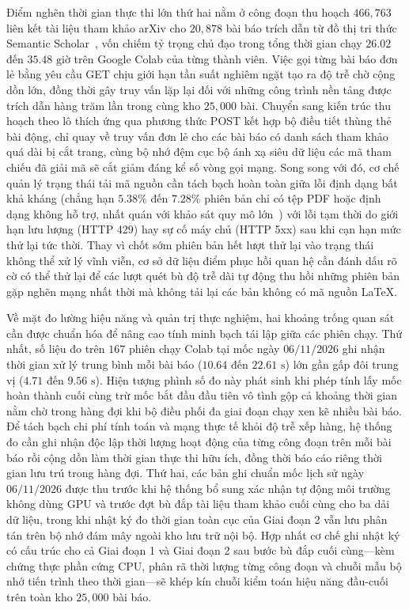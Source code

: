 Điểm nghẽn thời gian thực thi lớn thứ hai nằm ở công đoạn thu hoạch $466{,}763$ liên kết tài liệu tham khảo arXiv cho $20{,}878$ bài báo trích dẫn từ đồ thị tri thức Semantic Scholar~\cite{kinney2023,ammar2018}, vốn chiếm tỷ trọng chủ đạo trong tổng thời gian chạy $26.02$ đến $35.48\text{ giờ}$ trên Google Colab của từng thành viên. Việc gọi từng bài báo đơn lẻ bằng yêu cầu GET chịu giới hạn tần suất nghiêm ngặt tạo ra độ trễ chờ cộng dồn lớn, đồng thời gây truy vấn lặp lại đối với những công trình nền tảng được trích dẫn hàng trăm lần trong cùng kho $25{,}000$ bài. Chuyển sang kiến trúc thu hoạch theo lô thích ứng qua phương thức POST kết hợp bộ điều tiết thùng thẻ bài động, chỉ quay về truy vấn đơn lẻ cho các bài báo có danh sách tham khảo quá dài bị cắt trang, cùng bộ nhớ đệm cục bộ ánh xạ siêu dữ liệu các mã tham chiếu đã giải mã sẽ cắt giảm đáng kể số vòng gọi mạng. Song song với đó, cơ chế quản lý trạng thái tải mã nguồn cần tách bạch hoàn toàn giữa lỗi định dạng bất khả kháng (chẳng hạn $5.38\%$ đến $7.28\%$ phiên bản chỉ có tệp PDF hoặc định dạng không hỗ trợ, nhất quán với khảo sát quy mô lớn~\cite{ginev2024}) với lỗi tạm thời do giới hạn lưu lượng (HTTP 429) hay sự cố máy chủ (HTTP 5xx) sau khi cạn hạn mức thử lại tức thời. Thay vì chốt sớm phiên bản hết lượt thử lại vào trạng thái không thể xử lý vĩnh viễn, cơ sở dữ liệu điểm phục hồi quan hệ cần đánh dấu rõ cờ có thể thử lại để các lượt quét bù độ trễ dài tự động thu hồi những phiên bản gặp nghẽn mạng nhất thời mà không tải lại các bản không có mã nguồn LaTeX.

Về mặt đo lường hiệu năng và quản trị thực nghiệm, hai khoảng trống quan sát cần được chuẩn hóa để nâng cao tính minh bạch tái lập giữa các phiên chạy. Thứ nhất, số liệu đo trên $167$ phiên chạy Colab tại mốc ngày $06/11/2026$ ghi nhận thời gian xử lý trung bình mỗi bài báo ($10.64$ đến $22.61\text{ s}$) lớn gần gấp đôi trung vị ($4.71$ đến $9.56\text{ s}$). Hiện tượng phình số đo này phát sinh khi phép tính lấy mốc hoàn thành cuối cùng trừ mốc bắt đầu đầu tiên vô tình gộp cả khoảng thời gian nằm chờ trong hàng đợi khi bộ điều phối đa giai đoạn chạy xen kẽ nhiều bài báo. Để tách bạch chi phí tính toán và mạng thực tế khỏi độ trễ xếp hàng, hệ thống đo cần ghi nhận độc lập thời lượng hoạt động của từng công đoạn trên mỗi bài báo rồi cộng dồn làm thời gian thực thi hữu ích, đồng thời báo cáo riêng thời gian lưu trú trong hàng đợi. Thứ hai, các bản ghi chuẩn mốc lịch sử ngày $06/11/2026$ được thu trước khi hệ thống bổ sung xác nhận tự động môi trường không dùng GPU và trước đợt bù đắp tài liệu tham khảo cuối cùng cho ba dải dữ liệu, trong khi nhật ký đo thời gian toàn cục của Giai đoạn 2 vẫn lưu phân tán trên bộ nhớ đám mây ngoài kho lưu trữ nội bộ. Hợp nhất cơ chế ghi nhật ký có cấu trúc cho cả Giai đoạn 1 và Giai đoạn 2 sau bước bù đắp cuối cùng---kèm chứng thực phần cứng CPU, phân rã thời lượng từng công đoạn và chuỗi mẫu bộ nhớ tiến trình theo thời gian---sẽ khép kín chuỗi kiểm toán hiệu năng đầu-cuối trên toàn kho $25{,}000$ bài báo.

